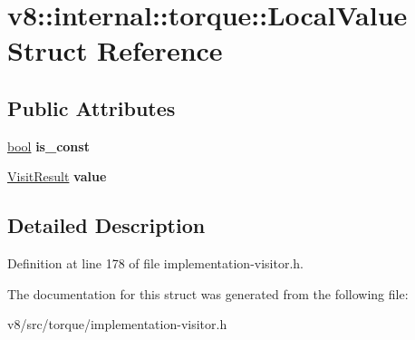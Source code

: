 \hypertarget{structv8_1_1internal_1_1torque_1_1LocalValue}{}\section{v8\+:\+:internal\+:\+:torque\+:\+:Local\+Value Struct Reference}
\label{structv8_1_1internal_1_1torque_1_1LocalValue}
\subsection*{Public Attributes}
\begin{DoxyCompactItemize}
\item 
\mbox{\label{structv8_1_1internal_1_1torque_1_1LocalValue_a2889cac5fe5b09b621ca603cbfb78de0}} 
\mbox{\hyperlink{classbool}{bool}} {\bfseries is\+\_\+const}
\item 
\mbox{\label{structv8_1_1internal_1_1torque_1_1LocalValue_a0e54078d06fb7e55da1eee41db4babfa}} 
\mbox{\hyperlink{classv8_1_1internal_1_1torque_1_1VisitResult}{Visit\+Result}} {\bfseries value}
\end{DoxyCompactItemize}


\subsection{Detailed Description}


Definition at line 178 of file implementation-\/visitor.\+h.



The documentation for this struct was generated from the following file\+:\begin{DoxyCompactItemize}
\item 
v8/src/torque/implementation-\/visitor.\+h\end{DoxyCompactItemize}
